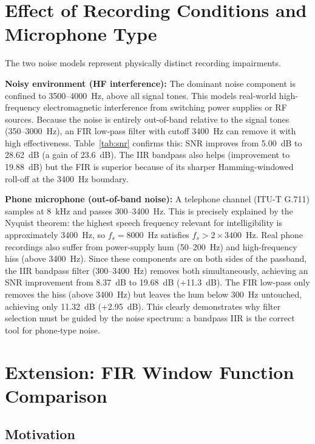 \documentclass[journal]{IEEEtran}
\begin{document}
\section{Effect of Recording Conditions and Microphone Type}
\label{sec:conditions}

The two noise models represent physically distinct recording impairments.

\textbf{Noisy environment (HF interference):} The dominant noise component is
confined to 3500--4000~Hz, above all signal tones. This models real-world
high-frequency electromagnetic interference from switching power supplies or
RF sources. Because the noise is entirely out-of-band relative to the signal
tones (350--3000~Hz), an FIR low-pass filter with cutoff 3400~Hz can remove it
with high effectiveness. Table~\ref{tab:snr} confirms this: SNR improves from
5.00~dB to 28.62~dB (a gain of 23.6~dB). The IIR bandpass also helps
(improvement to 19.88~dB) but the FIR is superior because of its sharper
Hamming-windowed roll-off at the 3400~Hz boundary.

\textbf{Phone microphone (out-of-band noise):} A telephone channel (ITU-T G.711)
samples at 8~kHz and passes 300--3400~Hz. This is precisely explained by the
Nyquist theorem: the highest speech frequency relevant for intelligibility is
approximately 3400~Hz, so $f_s = 8000$~Hz satisfies $f_s > 2 \times 3400$~Hz.
Real phone recordings also suffer from power-supply hum (50--200~Hz) and
high-frequency hiss (above 3400~Hz). Since these components are on both sides
of the passband, the IIR bandpass filter (300--3400~Hz) removes both simultaneously,
achieving an SNR improvement from 8.37~dB to 19.68~dB (+11.3~dB). The FIR low-pass
only removes the hiss (above 3400~Hz) but leaves the hum below 300~Hz untouched,
achieving only 11.32~dB (+2.95~dB). This clearly demonstrates why filter selection
must be guided by the noise spectrum: a bandpass IIR is the correct tool for
phone-type noise.

\section{Extension: FIR Window Function Comparison}
\label{sec:extension}

\subsection{Motivation}
\end{document}
